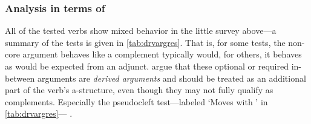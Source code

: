 \subsubsection{Analysis in terms of \Lfg{}}

All of the tested verbs show mixed behavior in the little survey above---a
summary of the tests is given in \autoref{tab:drvargres}. That is, for some
tests, the non-core argument behaves like a complement typically would, for
others, it behaves as would be expected from an adjunct. \citet{needhamtoivonen2011} argue that these optional or
required in-between arguments are \emph{derived arguments} and should be treated
as an additional part of the verb's a-structure, even though they may not fully
qualify as complements. Especially the pseudocleft test---labeled `Moves with
' in \autoref{tab:drvargres}---%
.

